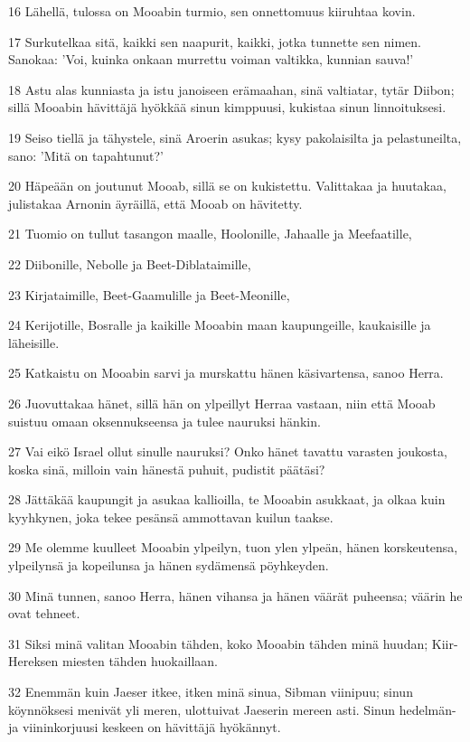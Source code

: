 \par 16 Lähellä, tulossa on Mooabin turmio, sen onnettomuus kiiruhtaa kovin.
\par 17 Surkutelkaa sitä, kaikki sen naapurit, kaikki, jotka tunnette sen nimen. Sanokaa: 'Voi, kuinka onkaan murrettu voiman valtikka, kunnian sauva!'
\par 18 Astu alas kunniasta ja istu janoiseen erämaahan, sinä valtiatar, tytär Diibon; sillä Mooabin hävittäjä hyökkää sinun kimppuusi, kukistaa sinun linnoituksesi.
\par 19 Seiso tiellä ja tähystele, sinä Aroerin asukas; kysy pakolaisilta ja pelastuneilta, sano: 'Mitä on tapahtunut?'
\par 20 Häpeään on joutunut Mooab, sillä se on kukistettu. Valittakaa ja huutakaa, julistakaa Arnonin äyräillä, että Mooab on hävitetty.
\par 21 Tuomio on tullut tasangon maalle, Hoolonille, Jahaalle ja Meefaatille,
\par 22 Diibonille, Nebolle ja Beet-Diblataimille,
\par 23 Kirjataimille, Beet-Gaamulille ja Beet-Meonille,
\par 24 Kerijotille, Bosralle ja kaikille Mooabin maan kaupungeille, kaukaisille ja läheisille.
\par 25 Katkaistu on Mooabin sarvi ja murskattu hänen käsivartensa, sanoo Herra.
\par 26 Juovuttakaa hänet, sillä hän on ylpeillyt Herraa vastaan, niin että Mooab suistuu omaan oksennukseensa ja tulee nauruksi hänkin.
\par 27 Vai eikö Israel ollut sinulle nauruksi? Onko hänet tavattu varasten joukosta, koska sinä, milloin vain hänestä puhuit, pudistit päätäsi?
\par 28 Jättäkää kaupungit ja asukaa kallioilla, te Mooabin asukkaat, ja olkaa kuin kyyhkynen, joka tekee pesänsä ammottavan kuilun taakse.
\par 29 Me olemme kuulleet Mooabin ylpeilyn, tuon ylen ylpeän, hänen korskeutensa, ylpeilynsä ja kopeilunsa ja hänen sydämensä pöyhkeyden.
\par 30 Minä tunnen, sanoo Herra, hänen vihansa ja hänen väärät puheensa; väärin he ovat tehneet.
\par 31 Siksi minä valitan Mooabin tähden, koko Mooabin tähden minä huudan; Kiir-Hereksen miesten tähden huokaillaan.
\par 32 Enemmän kuin Jaeser itkee, itken minä sinua, Sibman viinipuu; sinun köynnöksesi menivät yli meren, ulottuivat Jaeserin mereen asti. Sinun hedelmän- ja viininkorjuusi keskeen on hävittäjä hyökännyt.
